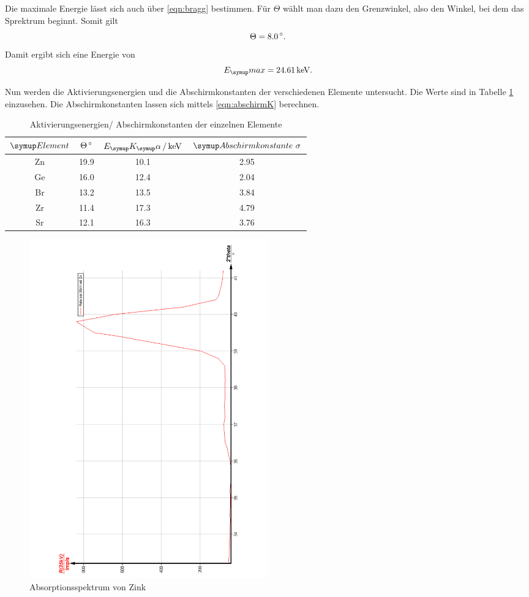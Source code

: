 Die maximale Energie lässt sich auch über \eqref{eqn:bragg} bestimmen. Für $\Theta$
wählt man dazu den Grenzwinkel, also den Winkel, bei dem das Sprektrum beginnt.
Somit gilt
\begin{equation}
  \Theta = 8.0 \,\si{\degree}.
\end{equation}
Damit ergibt sich eine Energie von
\begin{equation}
  E_\su{max} = 24.61 \keV.
\end{equation}

Nun werden die Aktivierungsenergien und die Abschirmkonstanten
der verschiedenen Elemente untersucht. Die
Werte sind in Tabelle \ref{tab:Energie} einzusehen. Die Abschirmkonstanten lassen
sich mittels \eqref{eqn:abschirmK} berechnen.
\begin{table}
  \centering
  \begin{tabular}{c c c c}
    \toprule
    $\su{Element}$ & $\Theta \,\si{\degree}$ & $E_\su{K_\su{\alpha}}\,/ \keV$ & $\su{Abschirmkonstante}\,\,\sigma$\\
    \midrule
    Zn & 19.9 & 10.1 & 2.95\\
    Ge & 16.0 & 12.4 & 2.04\\
    Br & 13.2 & 13.5 & 3.84\\
    Zr & 11.4 & 17.3 & 4.79\\
    Sr & 12.1 & 16.3 & 3.76\\
    \bottomrule
  \end{tabular}
  \caption{Aktivierungsenergien/ Abschirmkonstanten der einzelnen Elemente}
  \label{tab:Energie}
\end{table}



\begin{figure}
  \centering
  \includegraphics[width=0.5\textwidth, angle=270]{bilder/AbsorpZn.pdf}
  \caption{Absorptionsspektrum von Zink}
  \label{fig:Zink}
\end{figure}

